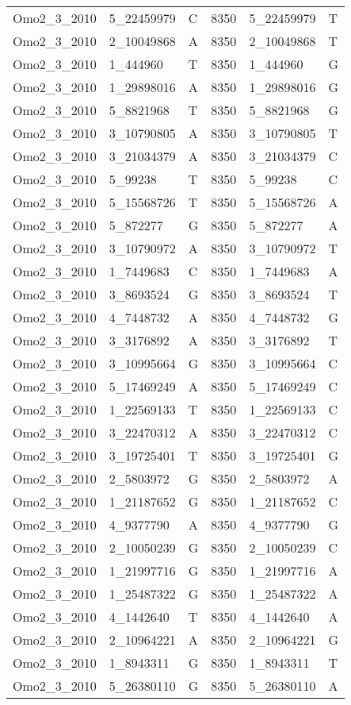 \begin{center}
\begin{longtable}{|l|l|l|l|l|l|}
Omo2\_3\_2010&5\_22459979&C&8350&5\_22459979&T\\
Omo2\_3\_2010&2\_10049868&A&8350&2\_10049868&T\\
Omo2\_3\_2010&1\_444960&T&8350&1\_444960&G\\
Omo2\_3\_2010&1\_29898016&A&8350&1\_29898016&G\\
Omo2\_3\_2010&5\_8821968&T&8350&5\_8821968&G\\
Omo2\_3\_2010&3\_10790805&A&8350&3\_10790805&T\\
Omo2\_3\_2010&3\_21034379&A&8350&3\_21034379&C\\
Omo2\_3\_2010&5\_99238&T&8350&5\_99238&C\\
Omo2\_3\_2010&5\_15568726&T&8350&5\_15568726&A\\
Omo2\_3\_2010&5\_872277&G&8350&5\_872277&A\\
Omo2\_3\_2010&3\_10790972&A&8350&3\_10790972&T\\
Omo2\_3\_2010&1\_7449683&C&8350&1\_7449683&A\\
Omo2\_3\_2010&3\_8693524&G&8350&3\_8693524&T\\
Omo2\_3\_2010&4\_7448732&A&8350&4\_7448732&G\\
Omo2\_3\_2010&3\_3176892&A&8350&3\_3176892&T\\
Omo2\_3\_2010&3\_10995664&G&8350&3\_10995664&C\\
Omo2\_3\_2010&5\_17469249&A&8350&5\_17469249&C\\
Omo2\_3\_2010&1\_22569133&T&8350&1\_22569133&C\\
Omo2\_3\_2010&3\_22470312&A&8350&3\_22470312&C\\
Omo2\_3\_2010&3\_19725401&T&8350&3\_19725401&G\\
Omo2\_3\_2010&2\_5803972&G&8350&2\_5803972&A\\
Omo2\_3\_2010&1\_21187652&G&8350&1\_21187652&C\\
Omo2\_3\_2010&4\_9377790&A&8350&4\_9377790&G\\
Omo2\_3\_2010&2\_10050239&G&8350&2\_10050239&C\\
Omo2\_3\_2010&1\_21997716&G&8350&1\_21997716&A\\
Omo2\_3\_2010&1\_25487322&G&8350&1\_25487322&A\\
Omo2\_3\_2010&4\_1442640&T&8350&4\_1442640&A\\
Omo2\_3\_2010&2\_10964221&A&8350&2\_10964221&G\\
Omo2\_3\_2010&1\_8943311&G&8350&1\_8943311&T\\
Omo2\_3\_2010&5\_26380110&G&8350&5\_26380110&A\\

\end{longtable}
\end{center}
